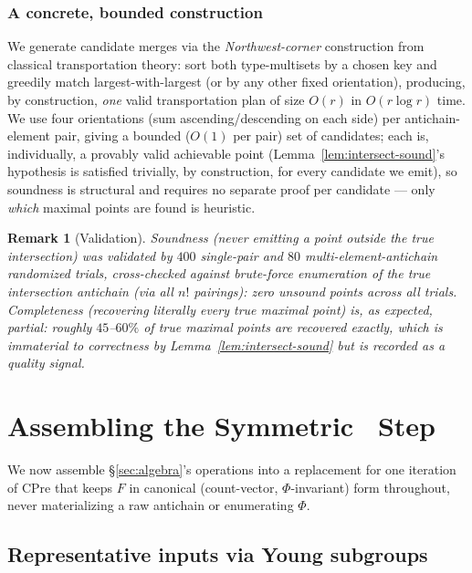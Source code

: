 \documentclass[11pt]{article}
\newtheorem{remark}{Remark}
\newcommand{\Phigroup}{\Phi}
\newcommand{\CPre}{\mathrm{CPre}}
\begin{document}
\subsubsection{A concrete, bounded construction}

We generate candidate merges via the \emph{Northwest-corner} construction
from classical transportation theory: sort both type-multisets by a chosen
key and greedily match largest-with-largest (or by any other fixed
orientation), producing, by construction, \emph{one} valid transportation
plan of size $O(r)$ in $O(r\log r)$ time. We use four orientations (sum
ascending/descending on each side) per antichain-element pair, giving a
bounded ($O(1)$ per pair) set of candidates; each is, individually, a
provably valid achievable point (Lemma~\ref{lem:intersect-sound}'s
hypothesis is satisfied trivially, by construction, for every candidate we
emit), so soundness is structural and requires no separate proof per
candidate --- only \emph{which} maximal points are found is heuristic.

\begin{remark}[Validation]
Soundness (never emitting a point outside the true intersection) was
validated by $400$ single-pair and $80$ multi-element-antichain randomized
trials, cross-checked against brute-force enumeration of the true
intersection antichain (via all $n!$ pairings): \emph{zero} unsound points
across all trials. Completeness (recovering literally every true maximal
point) is, as expected, partial: roughly $45$--$60\%$ of true maximal
points are recovered exactly, which is immaterial to correctness by
Lemma~\ref{lem:intersect-sound} but is recorded as a quality signal.
\end{remark}

\section{Assembling the Symmetric \CPre\ Step}
\label{sec:cpre-step}

We now assemble \S\ref{sec:algebra}'s operations into a replacement for
one iteration of $\CPre$ that keeps $F$ in canonical (count-vector,
$\Phigroup$-invariant) form throughout, never materializing a raw
antichain or enumerating $\Phigroup$.

\subsection{Representative inputs via Young subgroups}
\end{document}
